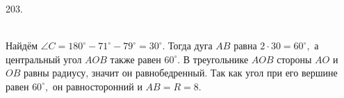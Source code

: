203. \begin{figure}[ht!]
\end{figure}\\
Найдём $\angle C=180^\circ-71^\circ-79^\circ=30^\circ.$ Тогда дуга $AB$ равна $2\cdot30=60^\circ,$ а центральный угол $AOB$ также равен $60^\circ.$ В треугольнике $AOB$ стороны $AO$ и $OB$ равны радиусу, значит он равнобедренный. Так как угол при его вершине равен $60^\circ,$ он равносторонний и $AB=R=8.$\\
